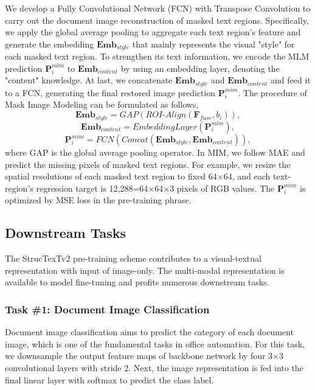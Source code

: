 \documentclass{article} %
\begin{document}
We develop a Fully Convolutional Network (FCN) with Transpose Convolution to carry out the document image reconstruction of masked text regions. Specifically, we apply the global average pooling to aggregate each text region's feature and generate the embedding $\mathbf{Emb}_{style}$ that mainly represents the visual "style" for each masked text region. To strengthen its text information, we encode the MLM prediction $\mathbf{P}_{i}^{mlm}$ to $\mathbf{Emb}_{content}$ by using an embedding layer, denoting the "content" knowledge. At last, we concatenate $\mathbf{Emb}_{style}$ and $\mathbf{Emb}_{content}$ and feed it to a FCN, generating the final restored image prediction $\mathbf{P}_{i}^{mim}$. The procedure of Mask Image Modeling can be formulated as follows,
\begin{equation}
\mathbf{Emb}_{style} = \textit{GAP}(\textit{ROI-Align}(\mathbf{F}_{fuse}, b_{i})),
\end{equation}
\begin{equation}
\mathbf{Emb}_{content} = \textit{EmbeddingLayer}(\mathbf{P}_{i}^{mlm}),
\end{equation}
\begin{equation}
\mathbf{P}_{i}^{mim} = \textit{FCN}(\textit{Concat}(\mathbf{Emb}_{style}, \mathbf{Emb}_{content})),
\end{equation}
where GAP is the global average pooling operator. In MIM, we follow MAE and predict the missing pixels of masked text regions. For example, we resize the spatial resolutions of each masked text region to fixed 64$\times$64, and each text-region's regression target is 12,288=64$\times$64$\times$3 pixels of RGB values. The $\mathbf{P}_{i}^{mim}$ is optimized by MSE loss in the pre-training phrase.

\subsection{Downstream Tasks}

The StrucTexTv2 pre-training scheme contributes to a visual-textual representation with input of image-only. The multi-modal representation is available to model fine-tuning and profits numerous downstream tasks.

\subsubsection{Task \#1: Document Image Classification}
Document image classification aims to predict the category of each document image, which is one of the fundamental tasks in office automation. For this task, we downsample the output feature maps of backbone network by four 3$\times$3 convolutional layers with stride 2. Next, the image representation is fed into the final linear layer with softmax to predict the class label.
\end{document}

